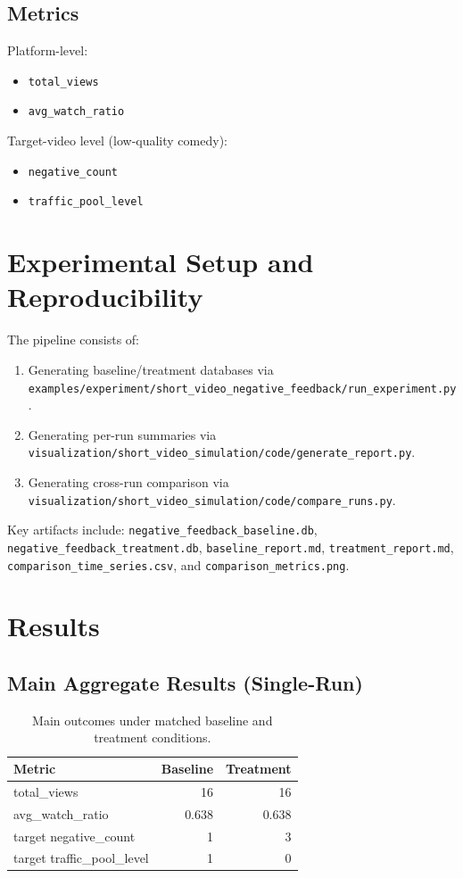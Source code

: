 \documentclass[11pt]{article}
\begin{document}
\subsection{Metrics}
Platform-level:
\begin{itemize}
\item \texttt{total\_views}
\item \texttt{avg\_watch\_ratio}
\end{itemize}
Target-video level (low-quality comedy):
\begin{itemize}
\item \texttt{negative\_count}
\item \texttt{traffic\_pool\_level}
\end{itemize}

\section{Experimental Setup and Reproducibility}
The pipeline consists of:
\begin{enumerate}
\item Generating baseline/treatment databases via
\texttt{examples/experiment/short\_video\_negative\_feedback/run\_experiment.py}.
\item Generating per-run summaries via
\texttt{visualization/short\_video\_simulation/code/generate\_report.py}.
\item Generating cross-run comparison via
\texttt{visualization/short\_video\_simulation/code/compare\_runs.py}.
\end{enumerate}

Key artifacts include:
\texttt{negative\_feedback\_baseline.db},
\texttt{negative\_feedback\_treatment.db},
\texttt{baseline\_report.md},
\texttt{treatment\_report.md},
\texttt{comparison\_time\_series.csv}, and
\texttt{comparison\_metrics.png}.

\section{Results}
\subsection{Main Aggregate Results (Single-Run)}
\begin{table}[h]
\centering
\begin{tabular}{lrr}
\toprule
Metric & Baseline & Treatment \\
\midrule
total\_views & 16 & 16 \\
avg\_watch\_ratio & 0.638 & 0.638 \\
target negative\_count & 1 & 3 \\
target traffic\_pool\_level & 1 & 0 \\
\bottomrule
\end{tabular}
\caption{Main outcomes under matched baseline and treatment conditions.}
\label{tab:main-results}
\end{table}
\end{document}
